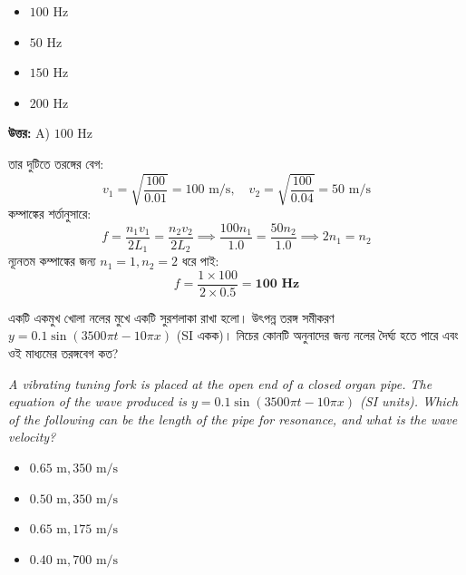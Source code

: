 \documentclass[12pt, a4paper]{article}
\begin{document}
\begin{itemize}[label={}, leftmargin=1cm, itemsep=0.5em]
    \item[\textbf{A)}] $100\text{ Hz}$
    \item[\textbf{B)}] $50\text{ Hz}$
    \item[\textbf{C)}] $150\text{ Hz}$
    \item[\textbf{D)}] $200\text{ Hz}$
\end{itemize}

\vspace{0.5em}
\begin{tcolorbox}[answerbox]
    \textbf{\color{success} উত্তর:} A) $100\text{ Hz}$
\end{tcolorbox}
\vspace{1em}

\begin{tcolorbox}[solutionbox={সমাধান (Solution)}]
    \noindent
    তার দুটিতে তরঙ্গের বেগ:
    \[ v_1 = \sqrt{\frac{100}{0.01}} = 100\text{ m/s}, \quad v_2 = \sqrt{\frac{100}{0.04}} = 50\text{ m/s} \]
    কম্পাঙ্কের শর্তানুসারে:
    \[ f = \frac{n_1 v_1}{2 L_1} = \frac{n_2 v_2}{2 L_2} \implies \frac{100 n_1}{1.0} = \frac{50 n_2}{1.0} \implies 2n_1 = n_2 \]
    ন্যূনতম কম্পাঙ্কের জন্য $n_1 = 1, n_2 = 2$ ধরে পাই:
    \[ f = \frac{1 \times 100}{2 \times 0.5} = \mathbf{100\text{ Hz}} \]
\end{tcolorbox}

\vspace{2em}

\begin{tcolorbox}[questionbox={প্রশ্ন (Question) 21}]
    \noindent
    একটি একমুখ খোলা নলের মুখে একটি সুরশলাকা রাখা হলো। উৎপন্ন তরঙ্গ সমীকরণ $y = 0.1 \sin(3500\pi t - 10\pi x)$ (SI একক)। নিচের কোনটি অনুনাদের জন্য নলের দৈর্ঘ্য হতে পারে এবং ওই মাধ্যমের তরঙ্গবেগ কত?
    
    \vspace{0.8em}
    \begin{english}
    \noindent\textit{\color{darkgray}
    A vibrating tuning fork is placed at the open end of a closed organ pipe. The equation of the wave produced is $y = 0.1 \sin(3500\pi t - 10\pi x)$ (SI units). Which of the following can be the length of the pipe for resonance, and what is the wave velocity?
    }
    \end{english}
\end{tcolorbox}

\begin{itemize}[label={}, leftmargin=1cm, itemsep=0.5em]
    \item[\textbf{A)}] $0.65\text{ m}, 350\text{ m/s}$
    \item[\textbf{B)}] $0.50\text{ m}, 350\text{ m/s}$
    \item[\textbf{C)}] $0.65\text{ m}, 175\text{ m/s}$
    \item[\textbf{D)}] $0.40\text{ m}, 700\text{ m/s}$
\end{itemize}
\end{document}

